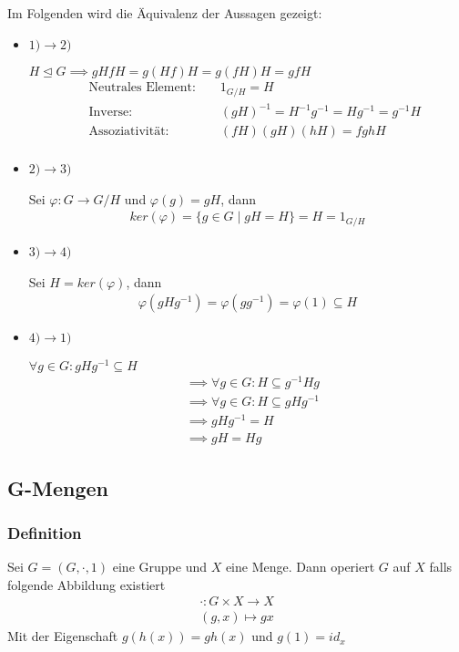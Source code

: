 \documentclass[12pt, german]{article}
\begin{document}
	Im Folgenden wird die Äquivalenz der Aussagen gezeigt: 
	\begin{itemize}
		\item $1)\rightarrow 2)$ ~\par
			$H\trianglelefteq G \implies gHfH = g(Hf)H = g(fH)H = gfH$
			\begin{align*}
				&\text{ Neutrales Element: } &&1_{G/H} = H \\
				&\text{ Inverse: } &&(gH)^{-1} = H^{-1}g^{-1}= Hg^{-1}=g^{-1}H \\
				&\text{ Assoziativität: } &&(fH)(gH)(hH)= fghH\\
			\end{align*}
			
		\item $2)\rightarrow 3)$ ~\par
		Sei $\varphi : G \to G/H $ und $\varphi(g) = gH$, dann
			\begin{align*}
				ker(\varphi) = \{g \in G \mid gH = H\} = H = 1_{G/H}
			\end{align*}
		
		\item $3)\rightarrow 4)$~\par
		Sei $H = ker(\varphi)$, dann
			\begin{align*}
				\varphi(gHg^{-1}) = \varphi(gg^{-1}) = \varphi(1) \subseteq H 
			\end{align*}
		
		\item $4)\rightarrow 1)$~\par
		$\forall g \in G : gHg^{-1} \subseteq H$
			\begin{align*}
			&\implies  \forall g \in G : H \subseteq g^{-1}Hg \\
			&\implies \forall g \in G : H \subseteq gHg^{-1} \\
			&\implies gHg^{-1} = H \\
			&\implies gH = Hg
			\end{align*}
	\end{itemize}



\subsection{G-Mengen}		
\subsubsection{Definition}
	Sei $G = (G, \cdot, 1)$ eine Gruppe und $X$ eine Menge.
	Dann operiert $G$ auf $X$ falls folgende Abbildung existiert 
	\begin{align*}
		\cdot : G \times X \to X \\ 
		(g,x) \mapsto gx
	\end{align*}
	Mit der Eigenschaft $g(h(x)) = gh(x)$ und $g(1) = id_x$
\end{document}
